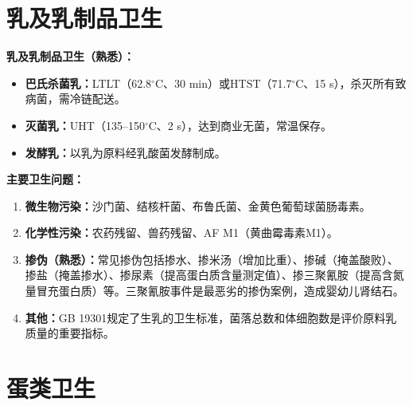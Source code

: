 \section{乳及乳制品卫生}

\begin{tipbox}
\textbf{乳及乳制品卫生（熟悉）：}

\begin{itemize}[leftmargin=*]
    \item \textbf{巴氏杀菌乳：}LTLT（62.8$^\circ$C、30 min）或HTST（71.7$^\circ$C、15 s），杀灭所有致病菌，需冷链配送。
    \item \textbf{灭菌乳：}UHT（135--150$^\circ$C、2 s），达到商业无菌，常温保存。
    \item \textbf{发酵乳：}以乳为原料经乳酸菌发酵制成。
\end{itemize}

\textbf{主要卫生问题：}
\begin{enumerate}[leftmargin=*]
    \item \textbf{微生物污染：}沙门菌、结核杆菌、布鲁氏菌、金黄色葡萄球菌肠毒素。
    \item \textbf{化学性污染：}农药残留、兽药残留、AF M1（黄曲霉毒素M1）。
    \item \textbf{掺伪（熟悉）：}常见掺伪包括掺水、掺米汤（增加比重）、掺碱（掩盖酸败）、掺盐（掩盖掺水）、掺尿素（提高蛋白质含量测定值）、掺三聚氰胺（提高含氮量冒充蛋白质）等。三聚氰胺事件是最恶劣的掺伪案例，造成婴幼儿肾结石。
    \item \textbf{其他：}GB 19301规定了生乳的卫生标准，菌落总数和体细胞数是评价原料乳质量的重要指标。
\end{enumerate}
\end{tipbox}

\section{蛋类卫生}

